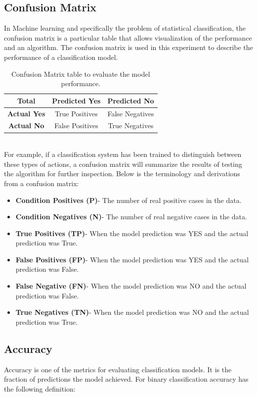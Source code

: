 \subsection{Confusion Matrix}
\hspace{5mm} In Machine learning and specifically the problem of statistical classification, the confusion matrix is a particular table that allows visualization of the performance and an algorithm. The confusion matrix is used in this experiment to describe the performance of a classification model.\\
\begin{table}[]
\centering
\begin{tabular}{|c|c|c|}
\hline
\textbf{Total}      & \textbf{Predicted Yes} & \textbf{Predicted No} \\ \hline
\textbf{Actual Yes} & True Positives         & False Negatives       \\ \hline
\textbf{Actual No}  & False Positives        & True Negatives        \\ \hline
\end{tabular}
\caption{Confusion Matrix table to evaluate the model performance.}
\label{my-label}
\end{table}\hfill \\

For example, if a classification system has been trained to distinguish between these types of actions, a confusion matrix will summarize the results of testing the algorithm for further inspection. Below is the terminology and derivations from a confusion matrix:
\begin{itemize}
    \item \textbf{Condition Positives (P)}- The number of real positive cases in the data.
    \item \textbf{Condition Negatives (N)}- The number of real negative cases in the data.
    \item \textbf{True Positives (TP)}- When the model prediction was YES and the actual prediction was True.
    \item \textbf{False Positives (FP)}- When the model prediction was YES and the actual prediction was False.
    \item \textbf{False Negative (FN)}- When the model prediction was NO and the actual prediction was False.
    \item \textbf{True Negatives (TN)}- When the model prediction was NO and the actual prediction was True.
\end{itemize}
\subsection{Accuracy}
\hspace{5mm} Accuracy is one of the metrics for evaluating classification models. It is the fraction of predictions the model achieved. For binary classification accuracy has the following definition:\\

